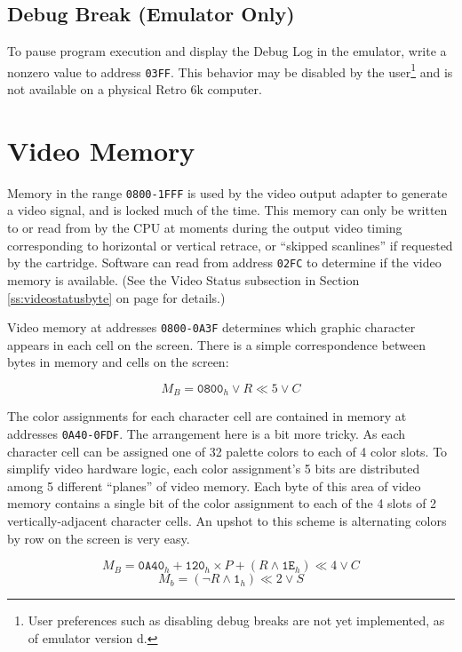 \documentclass[12pt]{{memoir}}
\begin{document}
\subsection{Debug Break (Emulator Only)}

To pause program execution and display the Debug Log in the emulator, write a nonzero value to address \texttt{03FF}. This behavior may be disabled by the user\footnote{User preferences such as disabling debug breaks are not yet implemented, as of emulator version d.} and is not available on a physical Retro 6k computer.

\section{Video Memory}
\label{sec:videomem}

Memory in the range \texttt{0800-1FFF} is used by the video output adapter to generate a video signal, and is locked much of the time. This memory can only be written to or read from by the CPU at moments during the output video timing corresponding to horizontal or vertical retrace, or ``skipped scanlines'' if requested by the cartridge. Software can read from address \texttt{02FC} to determine if the video memory is available. (See the Video Status subsection in Section \ref{ss:videostatusbyte} on page \pageref{ss:videostatusbyte} for details.)

Video memory at addresses \texttt{0800-0A3F} determines which graphic character appears in each cell on the screen. There is a simple correspondence between bytes in memory and cells on the screen:

$$M_B = \texttt{0800}_h \vee  R \ll 5 \vee C$$

The color assignments for each character cell are contained in memory at addresses \texttt{0A40-0FDF}. The arrangement here is a bit more tricky. As each character cell can be assigned one of 32 palette colors to each of 4 color slots. To simplify video hardware logic, each color assignment's 5 bits are distributed among 5 different ``planes'' of video memory. Each byte of this area of video memory contains a single bit of the color assignment to each of the 4 slots of 2 vertically-adjacent character cells. An upshot to this scheme is alternating colors by row on the screen is very easy.

$$M_B = \texttt{0A40}_h + \texttt{120}_h \times P + (R \wedge \texttt{1E}_h) \ll 4 \vee C$$
$$M_b = (\lnot{R} \wedge \texttt{1}_h) \ll 2 \vee S$$
\end{document}
